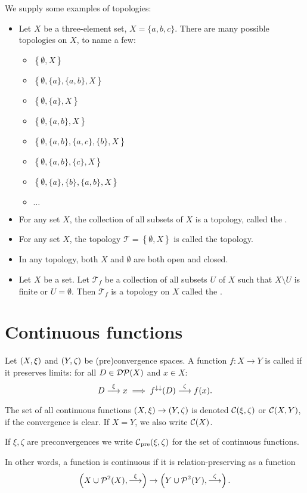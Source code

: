 \begin{example}
We supply some examples of topologies:
\begin{itemize}
\item Let $X$ be a three-element set, $X = \{a,b,c\}$. There are many possible topologies on $X$, to name a few:
\begin{itemize}
\item $\left\{\emptyset, X\right\}$
\item $\left\{\emptyset, \{a\}, \{a,b\}, X\right\}$
\item $\left\{\emptyset, \{a\}, X\right\}$
\item $\left\{\emptyset, \{a,b\}, X\right\}$
\item $\left\{\emptyset, \{a,b\}, \{a,c\}, \{b\}, X\right\}$
\item $\left\{\emptyset, \{a,b\}, \{c\}, X\right\}$
\item $\left\{\emptyset, \{a\}, \{b\}, \{a,b\}, X\right\}$
\item $\ldots$
\end{itemize}
\item For any set $X$, the collection of all subsets of $X$ is a topology, called the .
\item For any set $X$, the topology $\mathcal{T} = \left\{\emptyset, X\right\}$ is called the  topology.
\item In any topology, both $X$ and $\emptyset$ are both open and closed.
\item Let $X$ be a set. Let $\mathcal{T}_f$ be a collection of all subsets $U$ of $X$ such that $X\setminus U$ is finite or $U=\emptyset$. Then $\mathcal{T}_f$ is a topology on $X$ called the .
\end{itemize}
\end{example}

\section{Continuous functions}
\begin{definition}
Let $\left( X,\xi \right)$ and $\left( Y,\zeta \right)$ be (pre)convergence spaces. A function $f: X\to Y$ is called  if it preserves limits: for all $D \in \operatorname{\mathcal{DP}}(X)$ and $x\in X$:
\[ D \overset{\xi}{\longrightarrow} x \implies f^{\downarrow\downarrow}(D) \overset{\zeta}{\longrightarrow} f(x). \]

The set of all continuous functions $\left( X,\xi \right) \to \left( Y,\zeta \right)$ is denoted $\operatorname{\mathcal{C}}(\xi, \zeta)$ or $\operatorname{\mathcal{C}}(X,Y)$, if the convergence is clear. If $X=Y$, we also write $\operatorname{\mathcal{C}}(X)$.

If $\xi,\zeta$ are preconvergences we write $\operatorname{\mathcal{C}}_\text{pre}(\xi, \zeta)$ for the set of continuous functions.
\end{definition}
In other words, a function is continuous if it is relation-preserving as a function
\[ \left( X \cup \operatorname{\mathcal{P}}^2(X), \overset{\xi}{\longrightarrow} \right) \to \left( Y \cup \operatorname{\mathcal{P}}^2(Y), \overset{\zeta}{\longrightarrow} \right). \]

